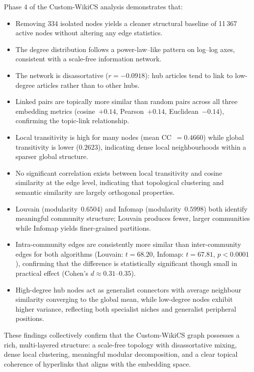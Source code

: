 \documentclass[12pt,a4paper]{article}
\begin{document}
Phase 4 of the Custom-WikiCS analysis demonstrates that:

\begin{itemize}
    \item Removing 334 isolated nodes yields a cleaner structural baseline of
          11\,367 active nodes without altering any edge statistics.
    \item The degree distribution follows a power-law--like pattern on log--log
          axes, consistent with a scale-free information network.
    \item The network is disassortative ($r=-0.0918$): hub articles tend to link
          to low-degree articles rather than to other hubs.
    \item Linked pairs are topically more similar than random pairs across all
          three embedding metrics (cosine~$+0.14$, Pearson~$+0.14$,
          Euclidean~$-0.14$), confirming the topic-link relationship.
    \item Local transitivity is high for many nodes (mean CC~$=0.4660$) while
          global transitivity is lower ($0.2623$), indicating dense local
          neighbourhoods within a sparser global structure.
    \item No significant correlation exists between local transitivity and
          cosine similarity at the edge level, indicating that topological
          clustering and semantic similarity are largely orthogonal properties.
    \item Louvain (modularity~$0.6504$) and Infomap (modularity~$0.5998$) both
          identify meaningful community structure; Louvain produces fewer,
          larger communities while Infomap yields finer-grained partitions.
    \item Intra-community edges are consistently more similar than
          inter-community edges for both algorithms (Louvain: $t=68.20$, Infomap:
          $t=67.81$, $p<0.0001$), confirming that the difference is statistically
          significant though small in practical effect (Cohen's $d\approx0.31$--$0.35$).
    \item High-degree hub nodes act as generalist connectors with average
          neighbour similarity converging to the global mean, while low-degree
          nodes exhibit higher variance, reflecting both specialist niches and
          generalist peripheral positions.
\end{itemize}

These findings collectively confirm that the Custom-WikiCS graph possesses a
rich, multi-layered structure: a scale-free topology with disassortative mixing,
dense local clustering, meaningful modular decomposition, and a clear
topical coherence of hyperlinks that aligns with the embedding space.
\end{document}
